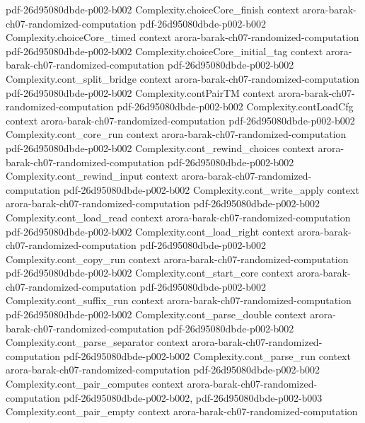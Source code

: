 \begin{theorem}
  {pdf-26d95080dbde-p002-b002}
\proofstep
  {Complexity.choiceCore_finish}
  {context}
  {arora-barak-ch07-randomized-computation}
  {pdf-26d95080dbde-p002-b002}
\proofstep
  {Complexity.choiceCore_timed}
  {context}
  {arora-barak-ch07-randomized-computation}
  {pdf-26d95080dbde-p002-b002}
\proofstep
  {Complexity.choiceCore_initial_tag}
  {context}
  {arora-barak-ch07-randomized-computation}
  {pdf-26d95080dbde-p002-b002}
\proofstep
  {Complexity.cont_split_bridge}
  {context}
  {arora-barak-ch07-randomized-computation}
  {pdf-26d95080dbde-p002-b002}
\proofstep
  {Complexity.contPairTM}
  {context}
  {arora-barak-ch07-randomized-computation}
  {pdf-26d95080dbde-p002-b002}
\proofstep
  {Complexity.contLoadCfg}
  {context}
  {arora-barak-ch07-randomized-computation}
  {pdf-26d95080dbde-p002-b002}
\proofstep
  {Complexity.cont_core_run}
  {context}
  {arora-barak-ch07-randomized-computation}
  {pdf-26d95080dbde-p002-b002}
\proofstep
  {Complexity.cont_rewind_choices}
  {context}
  {arora-barak-ch07-randomized-computation}
  {pdf-26d95080dbde-p002-b002}
\proofstep
  {Complexity.cont_rewind_input}
  {context}
  {arora-barak-ch07-randomized-computation}
  {pdf-26d95080dbde-p002-b002}
\proofstep
  {Complexity.cont_write_apply}
  {context}
  {arora-barak-ch07-randomized-computation}
  {pdf-26d95080dbde-p002-b002}
\proofstep
  {Complexity.cont_load_read}
  {context}
  {arora-barak-ch07-randomized-computation}
  {pdf-26d95080dbde-p002-b002}
\proofstep
  {Complexity.cont_load_right}
  {context}
  {arora-barak-ch07-randomized-computation}
  {pdf-26d95080dbde-p002-b002}
\proofstep
  {Complexity.cont_copy_run}
  {context}
  {arora-barak-ch07-randomized-computation}
  {pdf-26d95080dbde-p002-b002}
\proofstep
  {Complexity.cont_start_core}
  {context}
  {arora-barak-ch07-randomized-computation}
  {pdf-26d95080dbde-p002-b002}
\proofstep
  {Complexity.cont_suffix_run}
  {context}
  {arora-barak-ch07-randomized-computation}
  {pdf-26d95080dbde-p002-b002}
\proofstep
  {Complexity.cont_parse_double}
  {context}
  {arora-barak-ch07-randomized-computation}
  {pdf-26d95080dbde-p002-b002}
\proofstep
  {Complexity.cont_parse_separator}
  {context}
  {arora-barak-ch07-randomized-computation}
  {pdf-26d95080dbde-p002-b002}
\proofstep
  {Complexity.cont_parse_run}
  {context}
  {arora-barak-ch07-randomized-computation}
  {pdf-26d95080dbde-p002-b002}
\proofstep
  {Complexity.cont_pair_computes}
  {context}
  {arora-barak-ch07-randomized-computation}
  {pdf-26d95080dbde-p002-b002,
    pdf-26d95080dbde-p002-b003}
\proofstep
  {Complexity.cont_pair_empty}
  {context}
  {arora-barak-ch07-randomized-computation}

\end{theorem}
